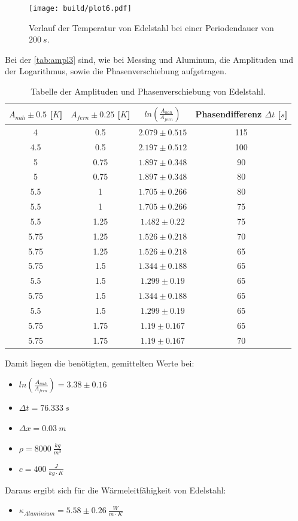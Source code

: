 \begin{figure}[htbp]
    \centering
    \texttt{[image: build/plot6.pdf]}
    \caption{Verlauf der Temperatur von Edelstahl bei einer Periodendauer von $200\ s$.}
    \label{fig:dynamic3}
\end{figure}

Bei der \autoref{tab:ampl3} sind, wie bei Messing und Aluminum, die Amplituden und der Logarithmus, sowie die Phasenverschiebung aufgetragen.

\begin{table}
    \centering
    \caption{Tabelle der Amplituden und Phasenverschiebung von Edelstahl.}
    \label{tab:ampl3}
    \begin{tabular}{c|c|c|c}
        \toprule
        $A_{nah}\pm 0.5$ [$K$] & $A_{fern}\pm 0.25$ [$K$] & $ln(\frac{A_{nah}}{A_{fern}})$ & Phasendifferenz $\Delta t$ [$s$]\\
        \midrule
        4 & 0.5 & $2.079\pm 0.515$ & 115\\
        4.5 & 0.5 & $2.197\pm 0.512$ & 100\\
        5 & 0.75 & $1.897\pm 0.348$ & 90\\
        5 & 0.75 & $1.897\pm 0.348$ & 80\\
        5.5 & 1 & $1.705\pm 0.266$ & 80\\
        5.5 & 1 & $1.705\pm 0.266$ & 75\\
        5.5 & 1.25 & $1.482\pm 0.22$ & 75\\
        5.75 & 1.25 & $1.526\pm 0.218$ & 70\\
        5.75 & 1.25 & $1.526\pm 0.218$ & 65\\
        5.75 & 1.5 & $1.344\pm 0.188$ & 65\\
        5.5 & 1.5 & $1.299\pm 0.19$ & 65\\
        5.75 & 1.5 & $1.344\pm 0.188$ & 65\\
        5.5 & 1.5 & $1.299\pm 0.19$ & 65\\
        5.75 & 1.75 & $1.19\pm 0.167$ & 65\\
        5.75 & 1.75 & $1.19\pm 0.167$ & 70\\
        \bottomrule
    \end{tabular}
\end{table}
\newpage
Damit liegen die benötigten, gemittelten Werte bei:

\begin{itemize}
    \centering
    \item[] $ln(\frac{A_{nah}}{A_{fern}}) = 3.38\pm 0.16$
    \item[] $\Delta t = 76.333\ s$
    \item[] $\Delta x = 0.03\ m$
    \item[] $\rho = 8000\ \frac{kg}{m^3}$
    \item[] $c = 400\ \frac{J}{kg\cdot K}$
\end{itemize}

Daraus ergibt sich für die Wärmeleitfähigkeit von Edelstahl:
\begin{itemize}
    \item[] $\kappa_{Aluminium} = 5.58\pm 0.26\ \frac{W}{m\cdot K}$
\end{itemize}